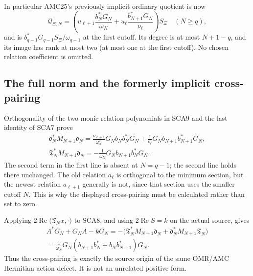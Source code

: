 In particular AMC25's previously implicit ordinary quotient is now
\[
 \mathcal Q_{\Xi,N}
  =\left(u_{\ell+1}\frac{b_N^*G_N}{\omega_N}
        +u_\ell\frac{b_{N+1}^*G_N}{\nu_\ell}\right)S_\Xi
 \quad(N\ge q),
 \tag{SCA11}
\]
and is $b_{q-1}^*G_{q-1}S_\Xi/\omega_{q-1}$ at the first cutoff.
Its degree is at most $N+1-q$, and its image has rank at most two
(at most one at the first cutoff). No chosen relation coefficient is omitted.

\subsection{The full norm and the formerly implicit cross-pairing}

Orthogonality of the two monic relation polynomials in SCA9 and the last
identity of SCA7 prove
\[
 \begin{gathered}
 \mathfrak d_N^*M_{N+1}\mathfrak d_N
 =\frac{\nu_{\ell+1}}{\omega_N^2}
      G_Nb_Nb_N^*G_N
  +\frac1{\nu_\ell}G_Nb_{N+1}b_{N+1}^*G_N,\\
 \boxed{\mathfrak T_N^*M_{N+1}\mathfrak d_N
       =-\frac1{\omega_N}G_Nb_{N+1}b_N^*G_N.}
 \end{gathered}\tag{SCA12}
\]
The second term in the first line is absent at $N=q-1$; the second line
holds there unchanged. The old relation $a_\ell$ is orthogonal to the
minimum section, but the newest relation $a_{\ell+1}$ generally is not,
since that section uses the smaller cutoff $N$. This is why the displayed
cross-pairing must be calculated rather than set to zero.

Applying $2\operatorname{Re}\langle\mathfrak T_Nx,\cdot\rangle$ to
SCA8, and using $2\operatorname{Re}S=k$ on the actual source, gives
\[
 \begin{gathered}
 A^*G_N+G_NA-kG_N
 =-\bigl(\mathfrak T_N^*M_{N+1}\mathfrak d_N
       +\mathfrak d_N^*M_{N+1}\mathfrak T_N\bigr)\\
 =\frac1{\omega_N}
    G_N(b_{N+1}b_N^*+b_Nb_{N+1}^*)G_N.
 \end{gathered}\tag{SCA13}
\]
Thus the cross-pairing is exactly the source origin of the same OMR/AMC
Hermitian action defect. It is not an unrelated positive form.

